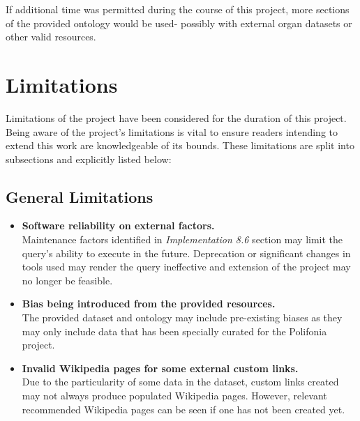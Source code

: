 If additional time was permitted during the course of this project, more sections of the provided ontology would be used- possibly with external organ datasets or other valid resources. 

\section{Limitations}
\hspace{0.5cm} Limitations of the project have been considered for the duration of this project. Being aware of the project's limitations is vital to ensure readers intending to extend this work are knowledgeable of its bounds. These limitations are split into subsections and explicitly listed below:

\subsection{General Limitations}
\begin{itemize}
    \item \textbf{Software reliability on external factors.} \\ Maintenance factors identified in \textit{Implementation 8.6} section may limit the query's ability to execute in the future. Deprecation or significant changes in tools used may render the query ineffective and extension of the project may no longer be feasible. 
    \item \textbf{Bias being introduced from the provided resources.} \\ The provided dataset and ontology may include pre-existing biases as they may only include data that has been specially curated for the Polifonia project. 
    \item \textbf{Invalid Wikipedia pages for some external custom links.} \\ Due to the particularity of some data in the dataset, custom links created may not always produce populated Wikipedia pages. However, relevant recommended Wikipedia pages can be seen if one has not been created yet.  
\end{itemize}

